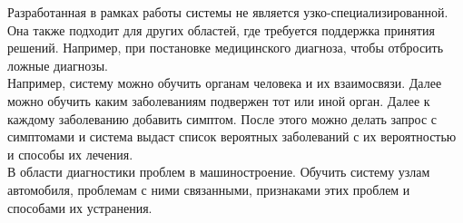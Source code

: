 Разработанная в рамках работы системы не является узко-специализированной. Она также подходит для других областей, где требуется поддержка принятия решений. Например, при постановке медицинского диагноза, чтобы отбросить ложные диагнозы. \\
Например, систему можно обучить органам человека и их взаимосвязи. Далее можно обучить каким заболеваниям подвержен тот или иной орган. Далее к каждому заболеванию добавить симптом. После этого можно делать запрос с симптомами и система выдаст список вероятных заболеваний с их вероятностью и способы их лечения. \\
В области диагностики проблем в машиностроение. Обучить систему узлам автомобиля, проблемам с ними связанными, признаками этих проблем и способами их устранения. 



